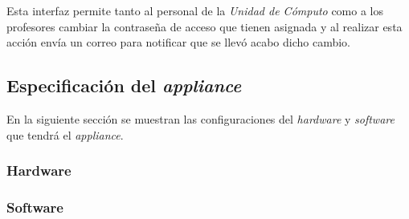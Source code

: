 Esta interfaz permite tanto al personal de la \textit{Unidad de C\'{o}mputo} como a los profesores cambiar la contrase\~{n}a de acceso que tienen asignada y al realizar esta acci\'{o}n env\'{i}a un correo para notificar que se llev\'{o} acabo dicho cambio.

\newpage
    \subsection {Especificaci\'{o}n del \textit{appliance}}

En la siguiente secci\'{o}n se muestran las configuraciones del \textit{hardware} y \textit{software} que tendr\'{a} el \textit{appliance}.

      \subsubsection {Hardware}

{
 \begin{table}[H]
 \caption{Recursos de \textit{hardware} utilizados para el \textit{appliance}}{}
 \label{tab:recursos-hardware}
 \noindent{} %
 \end{table}
}

      \subsubsection {Software}


